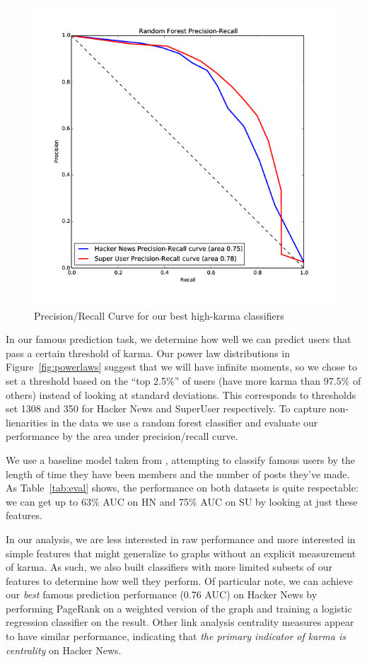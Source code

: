 \documentclass[11pt]{article}
\begin{document}
\begin{figure}[h]
\centering
\includegraphics[width=\linewidth]{classification_pr_curve-png}
\caption{Precision/Recall Curve for our best high-karma classifiers}
\label{fig:classification}
\end{figure}

In our famous prediction task, we determine how well we can predict users that
pass a certain threshold of karma. Our power law distributions in
Figure~\ref{fig:powerlaws} suggest that we will have infinite moments, so we
chose to set a threshold based on the ``top 2.5\%'' of users (have more karma
than 97.5\% of others) instead of looking at standard deviations. This
corresponds to thresholds set 1308 and 350 for Hacker News and SuperUser
respectively.  To capture non-lienarities in the data we use a random forest
classifier and evaluate our performance by the area under precision/recall
curve.

We use a baseline model taken from \citet{movshovitzanalysis}, attempting to
classify famous users by the length of time they have been members and the
number of posts they've made. As Table~\ref{tab:eval} shows, the performance on
both datasets is quite respectable: we can get up to 63\% AUC on HN and 75\% AUC
on SU by looking at just these features.

In our analysis, we are less interested in raw performance and more interested in 
simple features that might generalize
to graphs without an explicit measurement of karma. As such, we also built classifiers
with more limited subsets of our features to determine how well they perform. Of particular note,
we can achieve our \textit{best} famous prediction performance (0.76 AUC) 
on Hacker News by performing PageRank on a weighted version of the graph and training
a logistic regression classifier on the result. Other link analysis centrality measures 
appear to have similar performance, indicating that \textit{the primary indicator of karma 
is centrality} on Hacker News.
\end{document}
